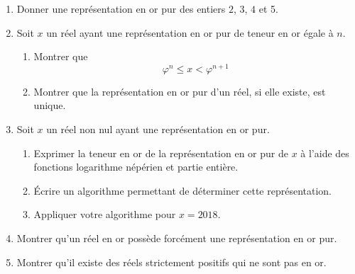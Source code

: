 \documentclass[landscape,twocolumn,leqno,a4paper,10pt]{report} %
\renewcommand{\leq}{\leqslant}
\begin{document}
\begin{enumerate}
	\item Donner une représentation en or pur des entiers $2$, $3$, $4$ et 5.
	\item Soit $x$ un réel ayant une représentation en or pur de teneur en or égale à $n$.
	\begin{enumerate}
		\item Montrer que $$\varphi^{n} \leq x<\varphi^{n+1}$$
		\item Montrer que la représentation en or pur d'un réel, si elle existe, est unique.
	\end{enumerate}
	\item Soit $x$ un réel non nul ayant une représentation en or pur.
	\begin{enumerate}
		\item Exprimer la teneur en or de la représentation en or pur de $x$ à l'aide des fonctions logarithme népérien et partie entière.
		\item Écrire un algorithme permettant de déterminer cette représentation.
		\item Appliquer votre algorithme pour $x=2018$.
	\end{enumerate}
	\item Montrer qu'un réel en or possède forcément une représentation en or pur.
	\item Montrer qu'il existe des réels strictement positifs qui ne sont pas en or.
\end{enumerate} 
\end{document}
